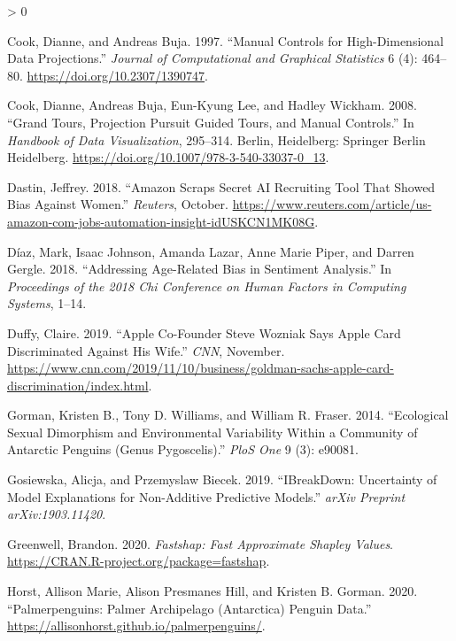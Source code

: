 \documentclass[
  article]{article}
\newlength{\cslhangindent}
\newenvironment{CSLReferences}[2] %
 {%
  \setlength{\parindent}{0pt}
  \ifodd #1 \everypar{\setlength{\hangindent}{\cslhangindent}}\ignorespaces\fi
  \ifnum #2 > 0
  \setlength{\parskip}{#2\baselineskip}
  \fi
 }%
 {}
\begin{document}
\begin{CSLReferences}{1}{0}
\leavevmode\hypertarget{ref-cook_manual_1997}{}%
Cook, Dianne, and Andreas Buja. 1997. {``Manual {Controls} for {High}-{Dimensional} {Data} {Projections}.''} \emph{Journal of Computational and Graphical Statistics} 6 (4): 464--80. \url{https://doi.org/10.2307/1390747}.

\leavevmode\hypertarget{ref-cook_grand_2008}{}%
Cook, Dianne, Andreas Buja, Eun-Kyung Lee, and Hadley Wickham. 2008. {``Grand {Tours}, {Projection} {Pursuit} {Guided} {Tours}, and {Manual} {Controls}.''} In \emph{Handbook of {Data} {Visualization}}, 295--314. Berlin, Heidelberg: Springer Berlin Heidelberg. \url{https://doi.org/10.1007/978-3-540-33037-0_13}.

\leavevmode\hypertarget{ref-dastin_amazon_2018}{}%
Dastin, Jeffrey. 2018. {``Amazon Scraps Secret {AI} Recruiting Tool That Showed Bias Against Women.''} \emph{Reuters}, October. \url{https://www.reuters.com/article/us-amazon-com-jobs-automation-insight-idUSKCN1MK08G}.

\leavevmode\hypertarget{ref-diaz_addressing_2018}{}%
Díaz, Mark, Isaac Johnson, Amanda Lazar, Anne Marie Piper, and Darren Gergle. 2018. {``Addressing Age-Related Bias in Sentiment Analysis.''} In \emph{Proceedings of the 2018 Chi Conference on Human Factors in Computing Systems}, 1--14.

\leavevmode\hypertarget{ref-duffy_apple_2019}{}%
Duffy, Claire. 2019. {``Apple Co-Founder {Steve} {Wozniak} Says {Apple} {Card} Discriminated Against His Wife.''} \emph{CNN}, November. \url{https://www.cnn.com/2019/11/10/business/goldman-sachs-apple-card-discrimination/index.html}.

\leavevmode\hypertarget{ref-gorman_ecological_2014}{}%
Gorman, Kristen B., Tony D. Williams, and William R. Fraser. 2014. {``Ecological Sexual Dimorphism and Environmental Variability Within a Community of {Antarctic} Penguins (Genus {Pygoscelis}).''} \emph{PloS One} 9 (3): e90081.

\leavevmode\hypertarget{ref-gosiewska_ibreakdown_2019}{}%
Gosiewska, Alicja, and Przemyslaw Biecek. 2019. {``{IBreakDown}: {Uncertainty} of Model Explanations for Non-Additive Predictive Models.''} \emph{arXiv Preprint arXiv:1903.11420}.

\leavevmode\hypertarget{ref-greenwell_fastshap_2020}{}%
Greenwell, Brandon. 2020. \emph{Fastshap: {Fast} {Approximate} {Shapley} {Values}}. \url{https://CRAN.R-project.org/package=fastshap}.

\leavevmode\hypertarget{ref-horst_palmerpenguins_2020}{}%
Horst, Allison Marie, Alison Presmanes Hill, and Kristen B. Gorman. 2020. {``Palmerpenguins: {Palmer} {Archipelago} ({Antarctica}) Penguin Data.''} \url{https://allisonhorst.github.io/palmerpenguins/}.


\end{CSLReferences}
\end{document}

